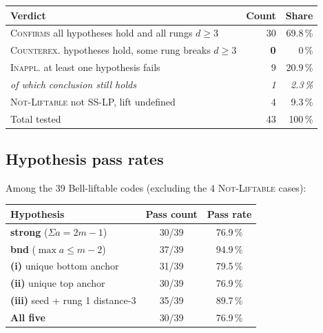 \documentclass[11pt]{article}
\newcommand{\vCONF}{\textcolor{cConfirm}{\textsc{Confirms}}}
\newcommand{\vINAP}{\textcolor{cInapp}{\textsc{Inappl.}}}
\newcommand{\vLIFT}{\textcolor{cLift}{\textsc{Not-Liftable}}}
\newcommand{\vCNTR}{\textcolor{cCounter}{\textsc{Counterex.}}}
\begin{document}
\begin{center}
\begin{tabular}{@{}lr@{\hspace{3em}}r@{}}
\toprule
Verdict & Count & Share \\
\midrule
\vCONF{}\hspace{1em} all hypotheses hold and all rungs $d\ge 3$ & 30 & 69.8\,\% \\
\vCNTR{}\hspace{1em} hypotheses hold, some rung breaks $d\ge 3$ & \textbf{0}  & 0\,\% \\
\vINAP{}\hspace{1em} at least one hypothesis fails             & 9 & 20.9\,\% \\
\hspace{1em}\textit{of which conclusion still holds} & \textit{1} & \textit{2.3\,\%} \\
\vLIFT{}\hspace{1em} not SS-LP, lift undefined                 & 4  & 9.3\,\% \\
\midrule
Total tested & 43 & 100\,\% \\
\bottomrule
\end{tabular}
\end{center}

\subsection{Hypothesis pass rates}

Among the 39 Bell-liftable codes (excluding the 4 \vLIFT{} cases):
\begin{center}
\begin{tabular}{@{}lcc@{}}
\toprule
Hypothesis & Pass count & Pass rate \\
\midrule
\textbf{strong} ($\Sigma a = 2m-1$)        & 30/39 & 76.9\,\% \\
\textbf{bnd} ($\max a \le m-2$)            & 37/39 & 94.9\,\% \\
\textbf{(i)} unique bottom anchor           & 31/39 & 79.5\,\% \\
\textbf{(ii)} unique top anchor             & 30/39 & 76.9\,\% \\
\textbf{(iii)} seed + rung 1 distance-3     & 35/39 & 89.7\,\% \\
\addlinespace
\textbf{All five}                           & 30/39 & 76.9\,\% \\
\bottomrule
\end{tabular}
\end{center}
\end{document}
